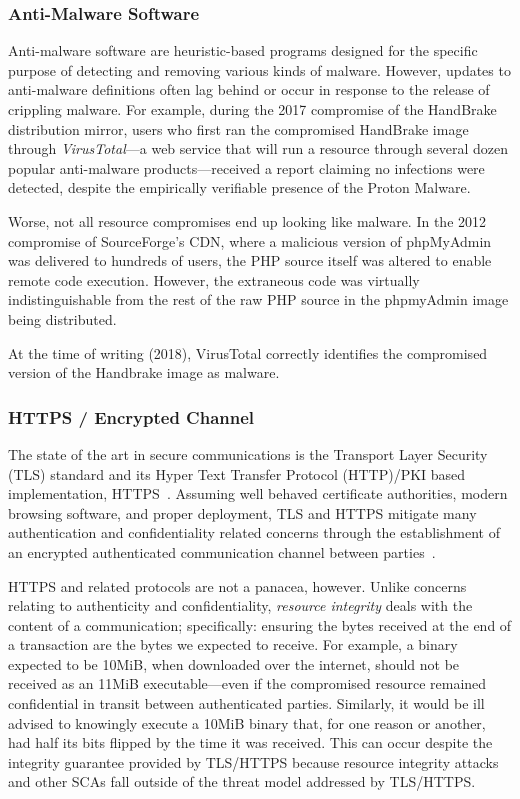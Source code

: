 \subsubsection{Anti-Malware Software}

Anti-malware software are heuristic-based programs designed for the specific
purpose of detecting and removing various kinds of malware. However, updates to
anti-malware definitions often lag behind or occur in response to the release of
crippling malware. For example, during the 2017 compromise of the HandBrake
distribution mirror, users who first ran the compromised HandBrake image through
\textit{VirusTotal}---a web service that will run a resource through several
dozen popular anti-malware products---received a report claiming no infections
were detected, despite the empirically verifiable presence of the Proton
Malware.

Worse, not all resource compromises end up looking like malware. In the 2012
compromise of SourceForge's CDN, where a malicious version of phpMyAdmin was
delivered to hundreds of users, the PHP source itself was altered to enable
remote code execution. However, the extraneous code was virtually
indistinguishable from the rest of the raw PHP source in the phpmyAdmin image
being distributed.

At the time of writing (2018), VirusTotal correctly identifies the compromised
version of the Handbrake image as malware.

\subsubsection{HTTPS / Encrypted Channel}

The state of the art in secure communications is the Transport Layer Security
(TLS) standard and its Hyper Text Transfer Protocol (HTTP)/PKI based
implementation, HTTPS~\cite{TLS1.2, HTTPS, PKI}. Assuming well behaved
certificate authorities, modern browsing software, and proper deployment, TLS
and HTTPS mitigate many authentication and confidentiality related concerns
through the establishment of an encrypted authenticated communication channel
between parties~\cite{HTTPS, TLS1.2, DTLS}.

HTTPS and related protocols are not a panacea, however. Unlike concerns relating
to authenticity and confidentiality, \textit{resource integrity} deals with the
content of a communication; specifically: ensuring the bytes received at the end
of a transaction are the bytes we expected to receive. For example, a binary
expected to be 10MiB, when downloaded over the internet, should not be received
as an 11MiB executable---even if the compromised resource remained confidential
in transit between authenticated parties. Similarly, it would be ill advised to
knowingly execute a 10MiB binary that, for one reason or another, had half its
bits flipped by the time it was received. This can occur despite the integrity
guarantee provided by TLS/HTTPS because resource integrity attacks and other
SCAs fall outside of the threat model addressed by TLS/HTTPS.

